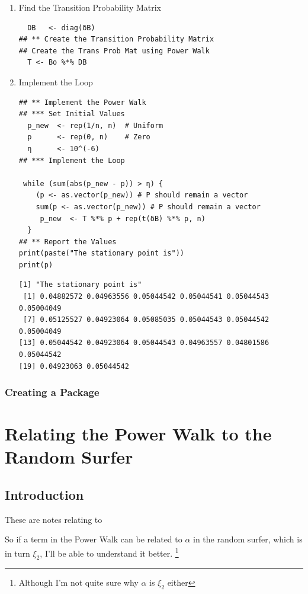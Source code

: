 \documentclass[11pt]{article}
\begin{document}
\begin{enumerate}
\begin{enumerate}
\item Find the Transition Probability Matrix
\label{sec:org6d024ad}
\begin{verbatim}
  DB   <- diag(δB)
## ** Create the Transition Probability Matrix
## Create the Trans Prob Mat using Power Walk
  T <- Bo %*% DB
\end{verbatim}

\item Implement the Loop
\label{sec:org7a51541}
\begin{verbatim}
## ** Implement the Power Walk
## *** Set Initial Values
  p_new  <- rep(1/n, n)  # Uniform
  p      <- rep(0, n)    # Zero
  η      <- 10^(-6)
## *** Implement the Loop

 while (sum(abs(p_new - p)) > η) {
    (p <- as.vector(p_new)) # P should remain a vector
    sum(p <- as.vector(p_new)) # P should remain a vector
     p_new  <- T %*% p + rep(t(δB) %*% p, n)
  }
## ** Report the Values
print(paste("The stationary point is"))
print(p)
\end{verbatim}

\begin{verbatim}
[1] "The stationary point is"
 [1] 0.04882572 0.04963556 0.05044542 0.05044541 0.05044543 0.05004049
 [7] 0.05125527 0.04923064 0.05085035 0.05044543 0.05044542 0.05004049
[13] 0.05044542 0.04923064 0.05044543 0.04963557 0.04801586 0.05044542
[19] 0.04923063 0.05044542
\end{verbatim}
\end{enumerate}
\end{enumerate}

\subsubsection{Creating a Package}
\label{sec:org9b1fc9e}
\section{Relating the Power Walk to the Random Surfer}
\label{relating-terms-in-power-walk-to-random-surfer}
\subsection{Introduction}
\label{sec:orgbf88d95}
These are notes relating to \cite[]{parkPowerWalkRevisiting2013}

So if a term in the Power Walk can be related to \(\alpha\) in the random
surfer, which is in turn \(\xi_2\), I'll be able to understand it better. \footnote{Although I'm not quite sure why \(\alpha\) is \(\xi_{2}\) either}
\end{document}
